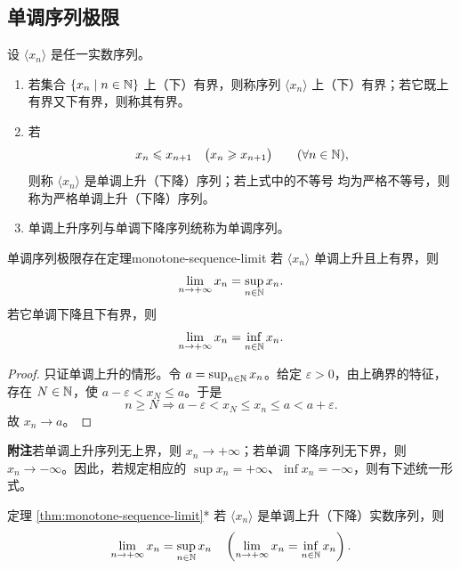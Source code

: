\subsection{单调序列极限}
	\label{sec:3-4-3}

\begin{mydef*}{}
设 \(\langle x_n\rangle\) 是任一实数序列。
\begin{enumerate}[label=\arabic*)]
  \item 若集合 \(\{x_n\mid n\in\mathbb{N}\}\) 上（下）有界，则称序列
  \(\langle x_n\rangle\) 上（下）有界；若它既上有界又下有界，则称其有界。
  \item 若
  \[
  x_n\leqslant x_{n+1}\quad
  \bigl(x_n\geqslant x_{n+1}\bigr)\qquad(\forall n\in\mathbb{N}),
  \]
  则称 \(\langle x_n\rangle\) 是单调上升（下降）序列；若上式中的不等号
  均为严格不等号，则称为严格单调上升（下降）序列。
  \item 单调上升序列与单调下降序列统称为单调序列。
\end{enumerate}
\end{mydef*}

\begin{mythm}{单调序列极限存在定理}{monotone-sequence-limit}
若 \(\langle x_n\rangle\) 单调上升且上有界，则
\[
\lim_{n\to+\infty}x_n=\sup_{n\in\mathbb{N}}x_n.
\]
若它单调下降且下有界，则
\[
\lim_{n\to+\infty}x_n=\inf_{n\in\mathbb{N}}x_n.
\]
\end{mythm}

\begin{proof}
只证单调上升的情形。令 \(a=\sup_{n\in\mathbb{N}}x_n\)。给定
\(\varepsilon>0\)，由上确界的特征，存在 \(N\in\mathbb{N}\)，使
\(a-\varepsilon<x_N\leqslant a\)。于是
\[
n\geqslant N\Longrightarrow
a-\varepsilon<x_N\leqslant x_n\leqslant a<a+\varepsilon.
\]
故 \(x_n\to a\)。
\end{proof}

\textbf{附注}\quad 若单调上升序列无上界，则 \(x_n\to+\infty\)；若单调
下降序列无下界，则 \(x_n\to-\infty\)。因此，若规定相应的
\(\sup x_n=+\infty\)、\(\inf x_n=-\infty\)，则有下述统一形式。

\begin{mythm*}{定理 \ref{thm:monotone-sequence-limit}*}
若 \(\langle x_n\rangle\) 是单调上升（下降）实数序列，则
\[
\lim_{n\to+\infty}x_n=\sup_{n\in\mathbb{N}}x_n
\quad\left(\lim_{n\to+\infty}x_n=\inf_{n\in\mathbb{N}}x_n\right).
\]
\end{mythm*}

